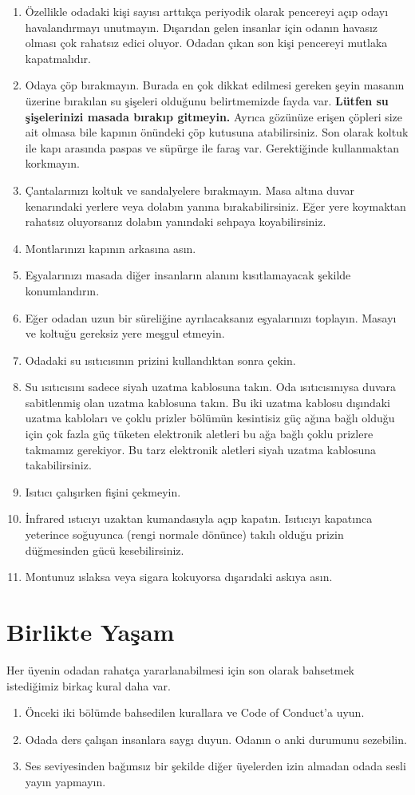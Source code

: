 \documentclass{article}
\begin{document}
\begin{enumerate}
	\item Özellikle odadaki kişi sayısı arttıkça periyodik olarak pencereyi
		açıp odayı havalandırmayı unutmayın. Dışarıdan gelen insanlar
		için odanın havasız olması çok rahatsız edici oluyor. Odadan
		çıkan son kişi pencereyi mutlaka kapatmalıdır.
	\item Odaya çöp bırakmayın. Burada en çok dikkat edilmesi gereken şeyin
		masanın üzerine bırakılan su şişeleri olduğunu belirtmemizde
		fayda var. \textbf{Lütfen su şişelerinizi masada bırakıp
		gitmeyin.} Ayrıca gözünüze erişen çöpleri size ait olmasa bile
		kapının önündeki çöp kutusuna atabilirsiniz. Son olarak koltuk
		ile kapı arasında paspas ve süpürge ile faraş var. Gerektiğinde
		kullanmaktan korkmayın.
	\item Çantalarınızı koltuk ve sandalyelere bırakmayın. Masa altına
		duvar kenarındaki yerlere veya dolabın yanına bırakabilirsiniz.
		Eğer yere koymaktan rahatsız oluyorsanız dolabın yanındaki
		sehpaya koyabilirsiniz.
	\item Montlarınızı kapının arkasına asın.
	\item Eşyalarınızı masada diğer insanların alanını kısıtlamayacak
		şekilde konumlandırın.
	\item Eğer odadan uzun bir süreliğine ayrılacaksanız eşyalarınızı
		toplayın. Masayı ve koltuğu gereksiz yere meşgul etmeyin.
	\item Odadaki su ısıtıcısının prizini kullandıktan sonra çekin.
	\item Su ısıtıcısını sadece siyah uzatma kablosuna takın. Oda ısıtıcısınıysa duvara sabitlenmiş olan uzatma kablosuna takın. Bu iki uzatma kablosu dışındaki uzatma kabloları ve çoklu prizler bölümün kesintisiz güç ağına bağlı olduğu için çok fazla güç tüketen elektronik aletleri bu ağa bağlı çoklu prizlere takmamız gerekiyor. Bu tarz elektronik aletleri siyah uzatma kablosuna takabilirsiniz.
	\item Isıtıcı çalışırken fişini çekmeyin.
	\item İnfrared ıstıcıyı uzaktan kumandasıyla açıp kapatın. Isıtıcıyı kapatınca yeterince soğuyunca (rengi normale dönünce) takılı olduğu prizin düğmesinden gücü kesebilirsiniz.
	\item Montunuz ıslaksa veya sigara kokuyorsa dışarıdaki askıya asın.
\end{enumerate}

\section{Birlikte Yaşam}
Her üyenin odadan rahatça yararlanabilmesi için son olarak bahsetmek
istediğimiz birkaç kural daha var.
\begin{enumerate}
	\item Önceki iki bölümde bahsedilen kurallara ve Code of Conduct'a
		uyun.
	\item Odada ders çalışan insanlara saygı duyun. Odanın o anki durumunu
		sezebilin.
	\item Ses seviyesinden bağımsız bir şekilde diğer üyelerden izin
		almadan odada sesli yayın yapmayın.
\end{enumerate}
	
\end{document}
